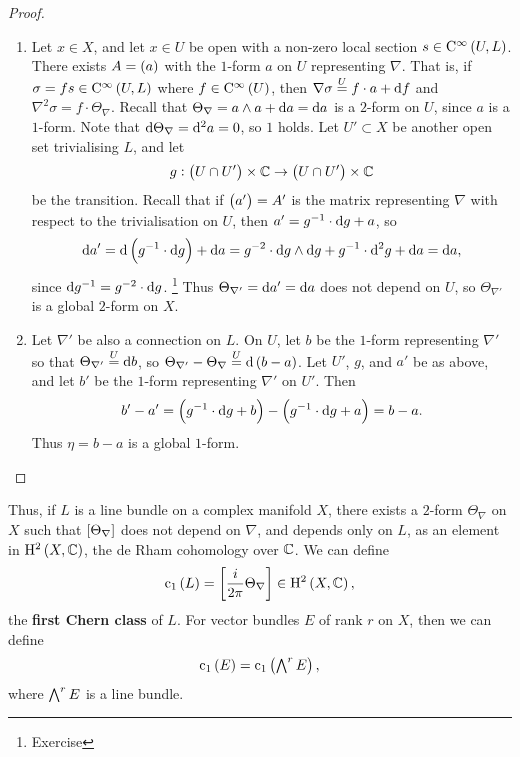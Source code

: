 \begin{proof}
\hfill
\begin{enumerate}
\item Let $ x \in X $, and let $ x \in U $ be open with a non-zero local section $ s \in \Ci{U, L} $. There exists $ A = \br{a} $ with the $ 1 $-form $ a $ on $ U $ representing $ \nabla $. That is, if $ \sigma = fs \in \Ci{U, L} $ where $ f \in \Ci{U} $, then $ \nabla\sigma \overset{U}{=} f \cdot a + \mathrm{d} f $ and $ \nabla^2\sigma = f \cdot \Theta_\nabla $. Recall that $ \Theta_\nabla = a \wedge a + \mathrm{d} a = \mathrm{d} a $ is a $ 2 $-form on $ U $, since $ a $ is a $ 1 $-form. Note that $ \mathrm{d}\Theta_\nabla = \mathrm{d}^2a = 0 $, so $ 1 $ holds. Let $ U' \subset X $ be another open set trivialising $ L $, and let
$$ g : \br{U \cap U'} \times \CC \to \br{U \cap U'} \times \CC $$
be the transition. Recall that if $ \br{a'} = A' $ is the matrix representing $ \nabla $ with respect to the trivialisation on $ U $, then $ a' = g^{-1} \cdot \mathrm{d} g + a $, so
$$ \d a' = \d\br{g^{-1} \cdot \d g} + \d a = g^{-2} \cdot \d g \wedge \d g + g^{-1} \cdot \d^2g + \d a = \d a, $$
since $ \mathrm{d} g^{-1} = g^{-2} \cdot \mathrm{d} g $. \footnote{Exercise} Thus $ \Theta_{\nabla'} = \mathrm{d} a' = \mathrm{d} a $ does not depend on $ U $, so $ \Theta_{\nabla'} $ is a global $ 2 $-form on $ X $.


\item Let $ \nabla' $ be also a connection on $ L $. On $ U $, let $ b $ be the $ 1 $-form representing $ \nabla' $ so that $ \Theta_{\nabla'} \overset{U}{=} \mathrm{d} b $, so $ \Theta_{\nabla'} - \Theta_\nabla \overset{U}{=} \d\br{b - a} $. Let $ U' $, $ g $, and $ a' $ be as above, and let $ b' $ be the $ 1 $-form representing $ \nabla' $ on $ U' $. Then
$$ b' - a' = \br{g^{-1} \cdot \d g + b} - \br{g^{-1} \cdot \d g + a} = b - a. $$
Thus $ \eta = b - a $ is a global $ 1 $-form.
\end{enumerate}
\end{proof}

\pagebreak

\begin{remark}
Thus, if $ L $ is a line bundle on a complex manifold $ X $, there exists a $ 2 $-form $ \Theta_\nabla $ on $ X $ such that $ \sbr{\Theta_\nabla} $ does not depend on $ \nabla $, and depends only on $ L $, as an element in $ \H^2\br{X, \CC} $, the de Rham cohomology over $ \mathbb{C} $. We can define
$$ \c_1\br{L} = \sbr{\dfrac{i}{2\pi}\Theta_\nabla} \in \H^2\br{X, \CC}, $$
the \textbf{first Chern class} of $ L $. For vector bundles $ E $ of rank $ r $ on $ X $, then we can define
$$ \c_1\br{E} = \c_1\br{\ext^rE}, $$
where $ \textstyle\bigwedge^rE $ is a line bundle.
\end{remark}

